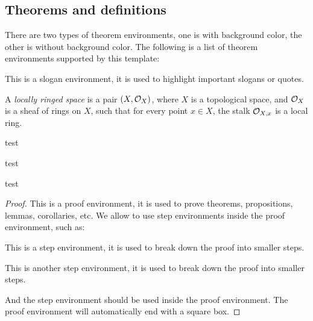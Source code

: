 \subsection{Theorems and definitions}\label{subsec:theorems_and_definitions}
    
    There are two types of theorem environments, one is with background color, the other is without background color. 
    The following is a list of theorem environments supported by this template:
    
    \begin{slogan}
        This is a slogan environment, it is used to highlight important slogans or quotes.
    \end{slogan}

    \begin{definition}
        A \emph{locally ringed space} is a pair \((X, {\mathcal{O}}_X)\), where \(X\) is a topological space, and \({\mathcal{O}}_X\) is a sheaf of rings on \(X\), such that for every point \(x \in X\), the stalk \({\mathcal{O}}_{X,x}\) is a local ring.
    \end{definition}

    \begin{construction}
        test
    \end{construction}

    \begin{notation}
        test
    \end{notation}

    \begin{proposition}
        test 
    \end{proposition}
    \begin{proof}
        This is a proof environment, it is used to prove theorems, propositions, lemmas, corollaries, etc.
        We allow to use step environments inside the proof environment, such as:
        \begin{step}\label{step:1_in_proof_1}
            This is a step environment, it is used to break down the proof into smaller steps.
        \end{step}
        \begin{step}\label{step:2_in_proof_1}
            This is another step environment, it is used to break down the proof into smaller steps.
        \end{step}
        And the step environment should be used inside the proof environment.
        The proof environment will automatically end with a square box.
    \end{proof}
    
